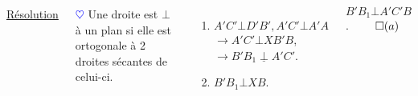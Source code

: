\documentclass[10pt]{beamer}
\def \heart {\textcolor{blue}{$\heartsuit$} }
\def \orthog {\underline{\perp}}
\begin{document}
{\begin{columns}[t]
		
		\centering
		
		\underline{Résolution}\\ \flushleft
		
		\heart Une droite est $\bot$ à un plan si elle est ortogonale à 2 droites sécantes de celui-ci.\\ \smallskip
		
		\begin{enumerate}
		 \item $A'C'\bot D'B', A'C'\bot A'A$ \\
		       $\rightarrow A'C'\bot XB'B$,\\
		       $\rightarrow B'B_1 \orthog A'C'$.
		 \item $B'B_1\bot XB$.
		\end{enumerate} \bigskip
		$B'B_1\bot A'C'B$. \hfill $\qed(a)$
	   \end{columns}  
    } 
\end{document}
